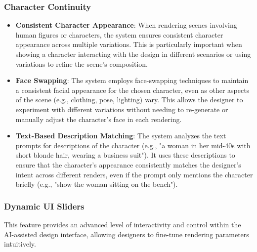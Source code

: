 \documentclass[12pt]{report}
\begin{document}
\subsubsection{Character Continuity}
\begin{itemize}
\item \textbf{Consistent Character Appearance}: When rendering scenes involving human figures or characters, the system ensures consistent character appearance across multiple variations. This is particularly important when showing a character interacting with the design in different scenarios or using variations to refine the scene's composition.
\item \textbf{Face Swapping}: The system employs face-swapping techniques to maintain a consistent facial appearance for the chosen character, even as other aspects of the scene (e.g., clothing, pose, lighting) vary. This allows the designer to experiment with different variations without needing to re-generate or manually adjust the character's face in each rendering.
\item \textbf{Text-Based Description Matching}: The system analyzes the text prompts for descriptions of the character (e.g., "a woman in her mid-40s with short blonde hair, wearing a business suit"). It uses these descriptions to ensure that the character's appearance consistently matches the designer's intent across different renders, even if the prompt only mentions the character briefly (e.g., "show the woman sitting on the bench").
\end{itemize}

\subsubsection{Dynamic UI Sliders}

This feature provides an advanced level of interactivity and control within the AI-assisted design interface, allowing designers to fine-tune rendering parameters intuitively.
\end{document}
